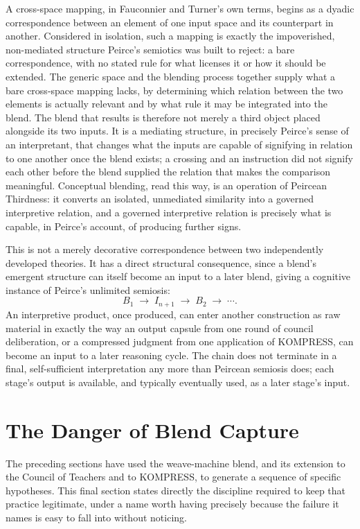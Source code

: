 \documentclass[11pt,openany]{book}
\begin{document}
A cross-space mapping, in Fauconnier and Turner's own terms, begins as a dyadic correspondence between an element of one input space and its counterpart in another. Considered in isolation, such a mapping is exactly the impoverished, non-mediated structure Peirce's semiotics was built to reject: a bare correspondence, with no stated rule for what licenses it or how it should be extended. The generic space and the blending process together supply what a bare cross-space mapping lacks, by determining which relation between the two elements is actually relevant and by what rule it may be integrated into the blend. The blend that results is therefore not merely a third object placed alongside its two inputs. It is a mediating structure, in precisely Peirce's sense of an interpretant, that changes what the inputs are capable of signifying in relation to one another once the blend exists; a crossing and an instruction did not signify each other before the blend supplied the relation that makes the comparison meaningful. Conceptual blending, read this way, is an operation of Peircean Thirdness: it converts an isolated, unmediated similarity into a governed interpretive relation, and a governed interpretive relation is precisely what is capable, in Peirce's account, of producing further signs.

This is not a merely decorative correspondence between two independently developed theories. It has a direct structural consequence, since a blend's emergent structure can itself become an input to a later blend, giving a cognitive instance of Peirce's unlimited semiosis:
\[
B_1 \;\rightarrow\; I_{n+1} \;\rightarrow\; B_2 \;\rightarrow\; \cdots.
\]
An interpretive product, once produced, can enter another construction as raw material in exactly the way an output capsule from one round of council deliberation, or a compressed judgment from one application of KOMPRESS, can become an input to a later reasoning cycle. The chain does not terminate in a final, self-sufficient interpretation any more than Peircean semiosis does; each stage's output is available, and typically eventually used, as a later stage's input.

\section{The Danger of Blend Capture}

The preceding sections have used the weave-machine blend, and its extension to the Council of Teachers and to KOMPRESS, to generate a sequence of specific hypotheses. This final section states directly the discipline required to keep that practice legitimate, under a name worth having precisely because the failure it names is easy to fall into without noticing.
\end{document}
